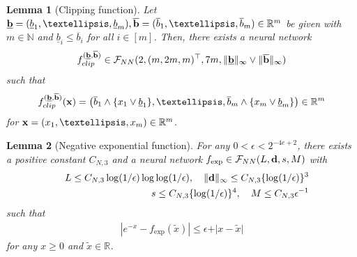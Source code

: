 \documentclass[10pt,a4paper]{amsart}
\newtheorem{lemma}{Lemma}
\newcommand{\bb}{{\bf b}}
\newcommand{\bbN}{{\mathbb N}}
\newcommand{\bbR}{{\mathbb R}}
\newcommand{\bd}{{\bf d}}
\newcommand{\bean}{\setlength\arraycolsep{1pt}\begin{eqnarray*}}
\newcommand{\bx}{{\bf x}}
\def\cF{\mathcal F}
\newcommand{\eean}{\end{eqnarray*}}
\begin{document}
\begin{lemma}[Clipping function]
\label{secnn:clip}
Let $\underline{\bb} = (\underline{b}_1,\ldots,\underline{b}_m), \overline{\bb} = (\overline{b}_1,\ldots,\overline{b}_m) \in \bbR^{m}$ be given with $m \in \bbN$ and $\underline{b}_i \leq \overline{b}_i$ for all $i \in [m]$. Then, there exists a neural network 
\bean
f_{\rm clip}^{(\underline{\bb},\overline{\bb})} \in \cF_{\rm NN}(2,(m,2m,m)^{\top}, 7m, \| \underline{\bb} \|_{\infty} \vee \| \overline{\bb} \|_{\infty} )
\eean
such that 
\bean
f_{\rm clip}^{(\underline{\bb},\overline{\bb})} (\bx) = \left( \overline{b}_1 \wedge \{x_1 \vee \underline{b}_1 \}, \ldots, \overline{b}_m \wedge \{ x_m \vee \underline{b}_m \}  \right) \in \bbR^{m}
\eean
for $\bx = (x_1,\ldots,x_m) \in \bbR^{m}$.
\end{lemma}

\begin{lemma}[Negative exponential function]
\label{secnn:exp}
For any $0 < \epsilon < 2^{-4e+2}$, there exists a positive constant $C_{N,3}$ and a neural network $f_{\exp} \in \cF_{\rm NN}(L,\bd,s,M)$ with
\bean
&& L \leq C_{N,3} \log(1/\epsilon) \log \log (1/\epsilon), \quad \|\bd\|_{\infty} \leq C_{N,3}  \{ \log(1/\epsilon)\}^{3}
\\
&& s \leq C_{N,3}  \{ \log(1/\epsilon)\}^{4}, \quad M \leq C_{N,3} \epsilon^{-1}
\eean
such that
\bean
\left\vert e^{-x} - f_{\exp}(\widetilde x) \right\vert \leq \epsilon + \vert x-\widetilde x\vert
\eean
for any $x \geq 0$ and $\widetilde x \in \bbR$.
\end{lemma}
\end{document}
